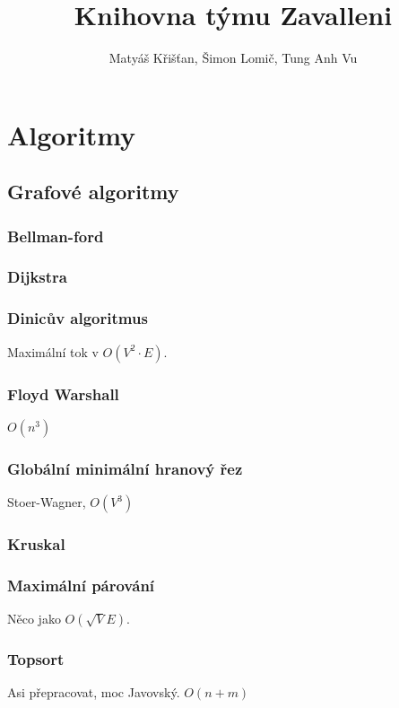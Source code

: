 \documentclass[10pt, a4paper]{article}
\title{Knihovna týmu Zavalleni}
\author{Matyáš Křišťan, Šimon Lomič, Tung Anh Vu}
\begin{document}
\tableofcontents

\section{Algoritmy}
\subsection{Grafové algoritmy}

\subsubsection{Bellman-ford}


\subsubsection{Dijkstra}


\subsubsection{Dinicův algoritmus}
Maximální tok v $O(V^2 \cdot E)$.


\subsubsection{Floyd Warshall}
$O(n^3)$


\subsubsection{Globální minimální hranový řez}
Stoer-Wagner, $O(V^3)$


\subsubsection{Kruskal}


\subsubsection{Maximální párování}
Něco jako $O(\sqrt{V}E)$.


\subsubsection{Topsort}
Asi přepracovat, moc Javovský. $O(n + m)$

\end{document}

